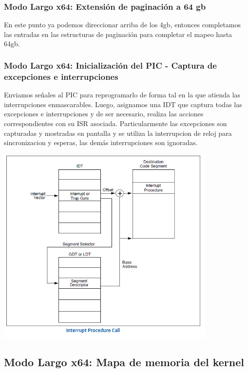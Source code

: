     \subsubsection{Modo Largo x64: Extensión de paginación a 64 gb}

    En este punto ya podemos direccionar arriba de los 4gb, entonces completamos las entradas en las estructuras de paginación para completar el mapeo hasta 64gb.

    \subsubsection{Modo Largo x64: Inicialización del PIC - Captura de excepciones e interrupciones}
	
    Enviamos señales al PIC para reprogramarlo de forma tal en la que atienda las interrupciones enmascarables.
    Luego, asignamos una IDT que captura todas las excepciones e interrupciones y de ser necesario, realiza las acciones correspondientes con su ISR asociada. Particularmente las excepciones son capturadas y mostradas en pantalla y se utiliza la interrupcion de reloj para sincronizacion y esperas, las demás interrupciones son ignoradas.

    \begin{center}
        \includegraphics[height=10cm]{images/interrupts.png}
    \end{center}

\subsection{Modo Largo x64: Mapa de memoria del kernel}

